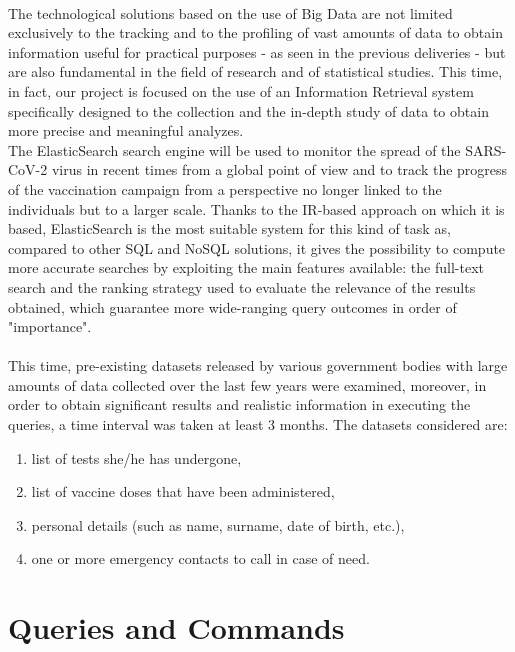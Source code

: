 \documentclass[a4paper,12pt]{article}
\begin{document}
\paragraph{}The technological solutions based on the use of Big Data are not limited exclusively to the tracking and to the profiling of vast amounts of data to obtain information useful for practical purposes - as seen in the previous deliveries - but are also fundamental in the field of research and of statistical studies. This time, in fact, our project is focused on the use of an Information Retrieval system specifically designed to the collection and the in-depth study of data to obtain more precise and meaningful analyzes. \\
The ElasticSearch search engine will be used to monitor the spread of the SARS-CoV-2 virus in recent times from a global point of view and to track the progress of the vaccination campaign from a perspective no longer linked to the individuals but to a larger scale. Thanks to the IR-based approach on which it is based, ElasticSearch is the most suitable system for this kind of task as, compared to other SQL and NoSQL solutions, it gives the possibility to compute more accurate searches by exploiting the main features available: the full-text search and the ranking strategy used to evaluate the relevance of the results obtained, which guarantee more wide-ranging query outcomes in order of "importance".
\paragraph{} This time, pre-existing datasets released by various government bodies with large amounts of data collected over the last few years were examined, moreover, in order to obtain significant results and realistic information in executing the queries, a time interval was taken at least 3 months. The datasets considered are:
  \begin{enumerate}[noitemsep]
    \item list of tests she/he has undergone,
    \item list of vaccine doses that have been administered,
    \item personal details (such as name, surname, date of birth, etc.),
    \item one or more emergency contacts to call in case of need.
   \end{enumerate}
\section{Queries and Commands}
\end{document}
